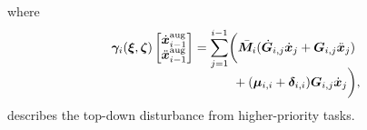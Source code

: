 \documentclass[../main.tex]{subfiles}
\begin{document}
where
\begin{equation}\label{eq:comp:gamma_expanded}
    \begin{split}
        \bm{\gamma}_i (\bm{\xi}, \bm{\zeta}) \begin{bmatrix}
        \dot{\bm{x}}^{\textrm{aug}}_{i-1} \\ \ddot{\bm{x}}^{\textrm{aug}}_{i-1}
        \end{bmatrix} =
        \sum_{j=1}^{i-1} &\bigg( \bar{\bm{M}}_i ( \dot{\bm{G}}_{i,j} \dot{\bm{x}}_{j} + \bm{G}_{i,j} \ddot{\bm{x}}_{j}  ) \\[-5pt]
        & \ + (\bm{\mu}_{i,i}  + \bm{\delta}_{i,i}) \bm{G}_{i,j} \dot{\bm{x}}_{j} \vphantom{\dot{\bm{G}}} \bigg),
    \end{split}
\end{equation}
describes the top-down disturbance from higher-priority tasks.
\end{document}
